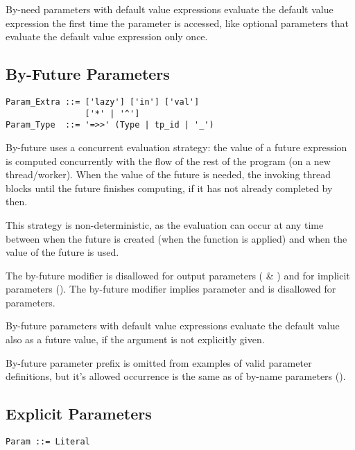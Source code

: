 By-need parameters with default value expressions evaluate the default value expression the first time the parameter is accessed, like optional parameters that evaluate the default value expression only once. 






\subsection{By-Future Parameters}
\label{sec:by-future-parameters}

\syntax\begin{lstlisting}
Param_Extra ::= ['lazy'] ['in'] ['val']
                ['*' | '^']
Param_Type  ::= '=>>' (Type | tp_id | '_')
\end{lstlisting}

By-future uses a concurrent evaluation strategy: the value of a future expression is computed concurrently with the flow of the rest of the program (on a new thread/worker). When the value of the future is needed, the invoking thread blocks until the future finishes computing, if it has not already completed by then. 

This strategy is non-deterministic, as the evaluation can occur at any time between when the future is created (when the function is applied) and when the value of the future is used. 

The by-future modifier is disallowed for output parameters ( \& ) and for implicit parameters (). The by-future modifier implies  parameter and is disallowed for  parameters. 

By-future parameters with default value expressions evaluate the default value also as a future value, if the argument is not explicitly given. 

By-future parameter prefix is omitted from examples of valid parameter definitions, but it's allowed occurrence is the same as of by-name parameters (). 





\subsection{Explicit Parameters}
\label{sec:explicit-parameters}

\syntax\begin{lstlisting}
Param ::= Literal
\end{lstlisting}

